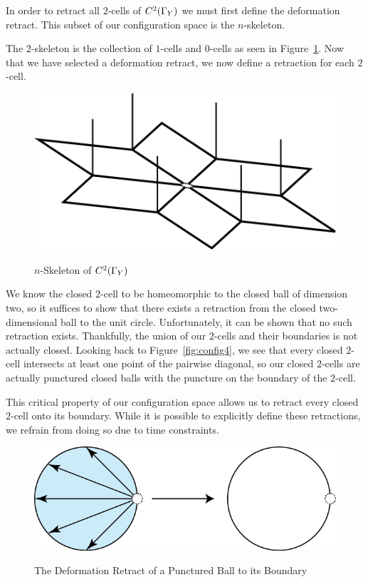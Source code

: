 In order to retract all $2$-cells of $C^2(\Gamma_Y)$ we must first define the deformation retract. This subset of our configuration space is the $n$-skeleton.

The $2$-skeleton is the collection of $1$-cells and $0$-cells as seen in Figure~\ref{fig:noint}. Now that we have selected a deformation retract, we now define a retraction for each $2$-cell. 

\begin{figure}[h]
\centering
\caption{$n$-Skeleton of $C^2(\Gamma_Y)$}
\includegraphics[scale=.5]{NoInt.png}
\label{fig:noint}
\end{figure}


We know the closed $2$-cell to be homeomorphic to the closed ball of dimension two, so it suffices to show that there exists a retraction from the closed two-dimensional ball to the unit circle. Unfortunately, it can be shown that no such retraction exists\cite{retract}. Thankfully, the union of our $2$-cells and their boundaries is not actually closed. Looking back to Figure~\ref{fig:config4}, we see that every closed $2$-cell intersects at least one point of the pairwise diagonal, so our closed $2$-cells are actually punctured closed balls with the puncture on the boundary of the $2$-cell.

This critical property of our configuration space allows us to retract every closed $2$-cell onto its boundary. While it is possible to explicitly define these retractions, we refrain from doing so due to time constraints.

\begin{figure}[h]
\centering
\caption{The Deformation Retract of a Punctured Ball to its Boundary}
\includegraphics[scale=1]{PuncturedBall.png}
\label{fig:pball}
\end{figure}

